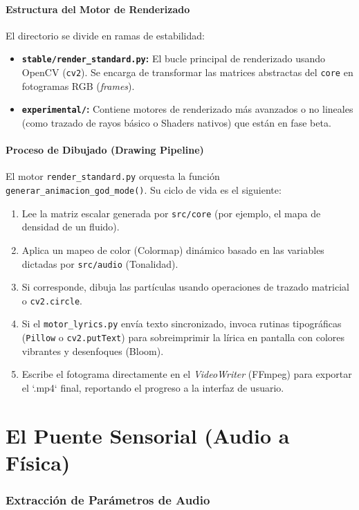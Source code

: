 \documentclass[12pt, openany]{book}
\begin{document}
\subsection{Estructura del Motor de Renderizado}
El directorio se divide en ramas de estabilidad:
\begin{itemize}
    \item \textbf{\texttt{stable/render\_standard.py}:} El bucle principal de renderizado usando OpenCV (\texttt{cv2}). Se encarga de transformar las matrices abstractas del \texttt{core} en fotogramas RGB (\textit{frames}).
    \item \textbf{\texttt{experimental/}:} Contiene motores de renderizado más avanzados o no lineales (como trazado de rayos básico o Shaders nativos) que están en fase beta.
\end{itemize}

\subsection{Proceso de Dibujado (Drawing Pipeline)}
El motor \texttt{render\_standard.py} orquesta la función \texttt{generar\_animacion\_god\_mode()}. Su ciclo de vida es el siguiente:
\begin{enumerate}
    \item Lee la matriz escalar generada por \texttt{src/core} (por ejemplo, el mapa de densidad de un fluido).
    \item Aplica un mapeo de color (Colormap) dinámico basado en las variables dictadas por \texttt{src/audio} (Tonalidad).
    \item Si corresponde, dibuja las partículas usando operaciones de trazado matricial o \texttt{cv2.circle}.
    \item Si el \texttt{motor\_lyrics.py} envía texto sincronizado, invoca rutinas tipográficas (\texttt{Pillow} o \texttt{cv2.putText}) para sobreimprimir la lírica en pantalla con colores vibrantes y desenfoques (Bloom).
    \item Escribe el fotograma directamente en el \textit{VideoWriter} (FFmpeg) para exportar el `.mp4` final, reportando el progreso a la interfaz de usuario.
\end{enumerate}

\part{El Puente Sensorial (Audio a Física)}

\section{Extracción de Parámetros de Audio}
\label{sec:extraccion_audio}
\end{document}
